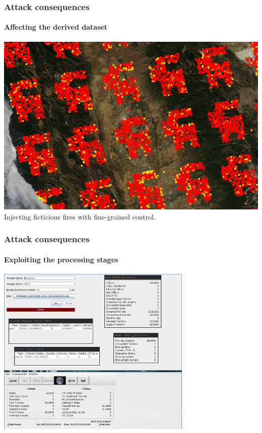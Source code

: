 \documentclass{beamer}
\begin{document}
\begin{frame}
  \frametitle{Attack consequences}
  \framesubtitle{Affecting the derived dataset}
  \includegraphics[width=\textwidth]{images/injection/amogi.jpg}
  \newline
  \centering
  Injecting ficticious fires with fine-grained control.
\end{frame}

\begin{frame}
  \frametitle{Attack consequences}
  \framesubtitle{Exploiting the processing stages}
  \centering
  \includegraphics[width=0.7\textwidth]{images/rtstps_correct.png}
\end{frame}
\end{document}
